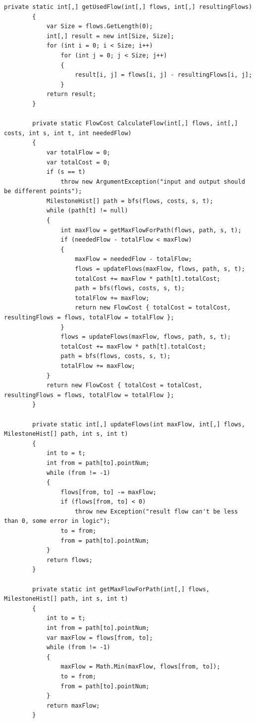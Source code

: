 \documentclass[a4paper,14pt,russian,ukrainian,oneside,final]{extreport}
\begin{document}
\begin{lstlisting}[style=csharpinlinestyle]
        private static int[,] getUsedFlow(int[,] flows, int[,] resultingFlows)
        {
            var Size = flows.GetLength(0);
            int[,] result = new int[Size, Size];
            for (int i = 0; i < Size; i++)
                for (int j = 0; j < Size; j++)
                {
                    result[i, j] = flows[i, j] - resultingFlows[i, j];
                }
            return result;
        }

        private static FlowCost CalculateFlow(int[,] flows, int[,] costs, int s, int t, int neededFlow)
        {
            var totalFlow = 0;
            var totalCost = 0;
            if (s == t)
                throw new ArgumentException("input and output should be different points");
            MilestoneHist[] path = bfs(flows, costs, s, t);
            while (path[t] != null)
            {
                int maxFlow = getMaxFlowForPath(flows, path, s, t);
                if (neededFlow - totalFlow < maxFlow)
                {
                    maxFlow = neededFlow - totalFlow;
                    flows = updateFlows(maxFlow, flows, path, s, t);
                    totalCost += maxFlow * path[t].totalCost;
                    path = bfs(flows, costs, s, t);
                    totalFlow += maxFlow;
                    return new FlowCost { totalCost = totalCost, resultingFlows = flows, totalFlow = totalFlow };
                }
                flows = updateFlows(maxFlow, flows, path, s, t);
                totalCost += maxFlow * path[t].totalCost;
                path = bfs(flows, costs, s, t);
                totalFlow += maxFlow;
            }
            return new FlowCost { totalCost = totalCost, resultingFlows = flows, totalFlow = totalFlow };
        }

        private static int[,] updateFlows(int maxFlow, int[,] flows, MilestoneHist[] path, int s, int t)
        {
            int to = t;
            int from = path[to].pointNum;
            while (from != -1)
            {
                flows[from, to] -= maxFlow;
                if (flows[from, to] < 0)
                    throw new Exception("result flow can't be less than 0, some error in logic");
                to = from;
                from = path[to].pointNum;
            }
            return flows;
        }

        private static int getMaxFlowForPath(int[,] flows, MilestoneHist[] path, int s, int t)
        {
            int to = t;
            int from = path[to].pointNum;
            var maxFlow = flows[from, to];
            while (from != -1)
            {
                maxFlow = Math.Min(maxFlow, flows[from, to]);
                to = from;
                from = path[to].pointNum;
            }
            return maxFlow;
        }


\end{lstlisting}
\end{document}
